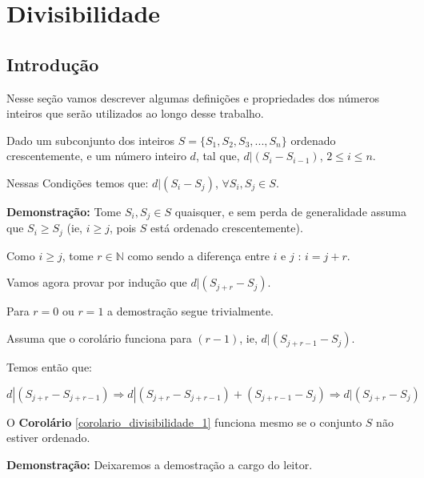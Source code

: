 
\chapter{Divisibilidade} %

\label{Chapter1} %


\section{Introdução}

Nesse seção vamos descrever algumas definições e propriedades dos números inteiros que serão utilizados ao longo desse trabalho.

\begin{definition}
\end{definition}

\begin{corollary}\label{corolario_divisibilidade_1}
Dado um subconjunto dos inteiros $S = \{S_1, S_2, S_3, ..., S_n\}$ ordenado crescentemente, e um número inteiro $d$, tal que, $d|(S_i-S_{i-1})$, $2 \leq i \leq n$. 

Nessas Condições temos que: $d|(S_i-S_j)$, $\forall S_i, S_j \in S$.
\end{corollary}
\textbf{Demonstração:}
Tome $S_i,S_j \in S$ quaisquer, e sem perda de generalidade assuma que $S_i \geq S_j$ (ie, $i \geq j$, pois $S$ está ordenado crescentemente).

Como $i \geq j$, tome $r \in \mathbb{N}$ como sendo a diferença entre $i$ e $j$ : $i = j + r$.

Vamos agora provar por indução que $d|(S_{j+r}-S_j)$.

Para $r=0$ ou $r=1$ a demostração segue trivialmente.

Assuma que o corolário funciona para $(r-1)$, ie, $d|(S_{j+r-1}-S_j)$. 

Temos então que: 

$d|(S_{j+r}-S_{j+r-1}) \Rightarrow d|(S_{j+r}-S_{j+r-1})+(S_{j+r-1}-S_j) \Rightarrow d|(S_{j+r}-S_j)$ 


\begin{corollary}
O \textbf{Corolário} \autoref{corolario_divisibilidade_1} funciona mesmo se o conjunto $S$ não estiver ordenado.
\end{corollary}
\textbf{Demonstração:}
Deixaremos a demostração a cargo do leitor.


